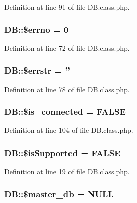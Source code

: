 Definition at line 91 of file D\-B.\-class.\-php.

\hypertarget{classDB_af99d759f7fb3bbadd579d72e686d1cf1}{
\subsubsection[{\$errno}]{\setlength{\rightskip}{0pt plus 5cm}D\-B\-::\$errno = 0}}\label{classDB_af99d759f7fb3bbadd579d72e686d1cf1}


Definition at line 72 of file D\-B.\-class.\-php.

\hypertarget{classDB_ae006f35821aba99713b834fa6a69e55b}{
\subsubsection[{\$errstr}]{\setlength{\rightskip}{0pt plus 5cm}D\-B\-::\$errstr = ''}}\label{classDB_ae006f35821aba99713b834fa6a69e55b}


Definition at line 78 of file D\-B.\-class.\-php.

\hypertarget{classDB_aac22b6ebcd8f78c2f70646d381f933dc}{
\subsubsection[{\$is\-\_\-connected}]{\setlength{\rightskip}{0pt plus 5cm}D\-B\-::\$is\-\_\-connected = F\-A\-L\-S\-E}}\label{classDB_aac22b6ebcd8f78c2f70646d381f933dc}


Definition at line 104 of file D\-B.\-class.\-php.

\hypertarget{classDB_a6b693edbdcdce5c86f42c050f62d8136}{
\subsubsection[{\$is\-Supported}]{\setlength{\rightskip}{0pt plus 5cm}D\-B\-::\$is\-Supported = F\-A\-L\-S\-E\hspace{0.3cm}{\ttfamily [static]}}}\label{classDB_a6b693edbdcdce5c86f42c050f62d8136}


Definition at line 19 of file D\-B.\-class.\-php.

\hypertarget{classDB_ad0a3ae175a659516131cfc6cd615d15c}{
\subsubsection[{\$master\-\_\-db}]{\setlength{\rightskip}{0pt plus 5cm}D\-B\-::\$master\-\_\-db = N\-U\-L\-L}}\label{classDB_ad0a3ae175a659516131cfc6cd615d15c}


